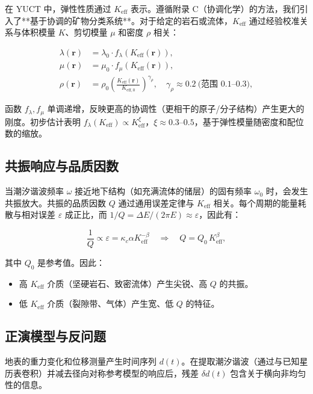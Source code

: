 \documentclass[12pt,a4paper]{article}
\theoremstyle{remark}
\newcommand{\Keff}{K_{\mathrm{eff}}}
\newcommand{\Keffzero}{K_{\mathrm{eff},0}}
\newcommand{\kappac}{\kappa_c}
\newcommand{\eps}{\varepsilon}
\begin{document}
	在 YUCT 中，弹性性质通过 $\Keff$ 表示。遵循附录 C（协调化学）的方法，我们引入了**基于协调的矿物分类系统**。对于给定的岩石或流体，$\Keff$ 通过经验校准关系与体积模量 $K$、剪切模量 $\mu$ 和密度 $\rho$ 相关：
	
	\begin{align}
		\lambda(\mathbf{r}) &= \lambda_0 \cdot f_\lambda(\Keff(\mathbf{r})), \\
		\mu(\mathbf{r}) &= \mu_0 \cdot f_\mu(\Keff(\mathbf{r})), \\
		\rho(\mathbf{r}) &= \rho_0 \left(\frac{\Keff(\mathbf{r})}{\Keffzero}\right)^{\gamma_\rho}, \quad \gamma_\rho \approx 0.2\ \text{(范围 0.1–0.3)},
		\label{eq:keff-properties}
	\end{align}
	
	函数 $f_\lambda, f_\mu$ 单调递增，反映更高的协调性（更相干的原子/分子结构）产生更大的刚度。初步估计表明 $f_\lambda(\Keff) \propto \Keff^{\xi}$，$\xi \approx 0.3$–$0.5$，基于弹性模量随密度和配位数的缩放。
	
	\subsection{共振响应与品质因数}
	
	当潮汐谐波频率 $\omega$ 接近地下结构（如充满流体的储层）的固有频率 $\omega_0$ 时，会发生共振放大。共振的品质因数 $Q$ 通过通用误差定律与 $\Keff$ 相关。每个周期的能量耗散与相对误差 $\eps$ 成正比，而 $1/Q = \Delta E / (2\pi E) \approx \eps$，因此有：
	
	\begin{equation}
		\frac{1}{Q} \propto \eps = \kappac \alpha \Keff^{-\beta} \quad \Longrightarrow \quad Q = Q_0 \, \Keff^{\beta},
		\label{eq:Q-keff}
	\end{equation}
	
	其中 $Q_0$ 是参考值。因此：
	\begin{itemize}
		\item 高 $\Keff$ 介质（坚硬岩石、致密流体）产生尖锐、高 $Q$ 的共振。
		\item 低 $\Keff$ 介质（裂隙带、气体）产生宽、低 $Q$ 的特征。
	\end{itemize}
	
	\subsection{正演模型与反问题}
	
	地表的重力变化和位移测量产生时间序列 $d(t)$。在提取潮汐谐波（通过与已知星历表卷积）并减去径向对称参考模型的响应后，残差 $\delta d(t)$ 包含关于横向非均匀性的信息。
	
\end{document}
